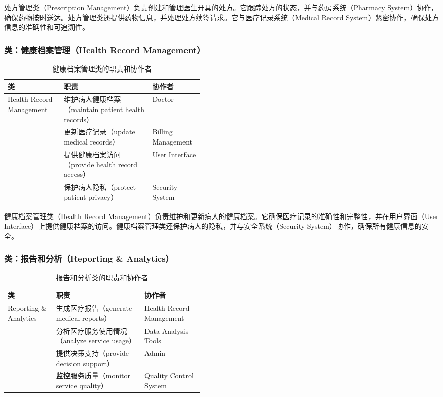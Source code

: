 处方管理类（Prescription Management）负责创建和管理医生开具的处方。它跟踪处方的状态，并与药房系统（Pharmacy System）协作，确保药物按时送达。处方管理类还提供药物信息，并处理处方续签请求。它与医疗记录系统（Medical Record System）紧密协作，确保处方信息的准确性和可追溯性。

\subsubsection{类：健康档案管理（Health Record Management）}
\begin{table}[htbp]
	\centering
	\begin{tabular}{|l|p{0.45\linewidth}|l|}
		\hline
		\textbf{类} & \textbf{职责} & \textbf{协作者} \\
		\hline
		Health Record Management & 维护病人健康档案（maintain patient health records） & Doctor \\
		& 更新医疗记录（update medical records） & Billing Management \\
		& 提供健康档案访问（provide health record access） & User Interface \\
		& 保护病人隐私（protect patient privacy） & Security System \\
		\hline
	\end{tabular}
	\caption{健康档案管理类的职责和协作者}
	\label{tab:health_record_management}
\end{table}

健康档案管理类（Health Record Management）负责维护和更新病人的健康档案。它确保医疗记录的准确性和完整性，并在用户界面（User Interface）上提供健康档案的访问。健康档案管理类还保护病人的隐私，并与安全系统（Security System）协作，确保所有健康信息的安全。

\subsubsection{类：报告和分析（Reporting \& Analytics）}
\begin{table}[htbp]
	\centering
	\begin{tabular}{|l|p{0.45\linewidth}|l|}
		\hline
		\textbf{类} & \textbf{职责} & \textbf{协作者} \\
		\hline
		Reporting \& Analytics & 生成医疗报告（generate medical reports） & Health Record Management \\
		& 分析医疗服务使用情况（analyze service usage） & Data Analysis Tools \\
		& 提供决策支持（provide decision support） & Admin \\
		& 监控服务质量（monitor service quality） & Quality Control System \\
		\hline
	\end{tabular}
	\caption{报告和分析类的职责和协作者}
	\label{tab:reporting_analytics}
\end{table}

